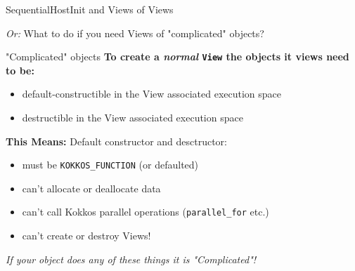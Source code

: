 
\begin{frame}[fragile]

  {\Huge SequentialHostInit and Views of Views}
  
    \vspace{10pt}
\begin{center}
\textit{Or:} What to do if you need Views of "complicated" objects?
\end{center}

\end{frame}


\begin{frame}[fragile]{"Complicated" objects}
\textbf{To create a \textit{normal} \texttt{View} the objects it views need to be:}
\begin{itemize}
  \item default-constructible in the View associated execution space
  \item destructible in the View associated execution space 
\end{itemize}

\vspace{10pt}

\textbf{This Means:} Default constructor and desctructor:
\begin{itemize}
\item{must be \texttt{KOKKOS\_FUNCTION} (or defaulted)}
\item{can't allocate or deallocate data}
\item{can't call Kokkos parallel operations (\texttt{parallel\_for} etc.)}
\item{can't create or destroy Views!}
\end{itemize}

\vspace{10pt}
\begin{center}
\textit{If your object does any of these things it is "Complicated"!}
\end{center}

\end{frame}


